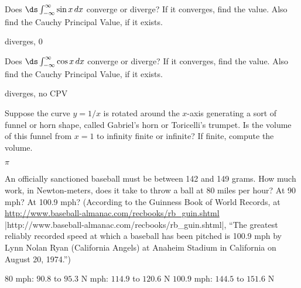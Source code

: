 \begin{exercises}
\exercise Does $\ds\int_{-\infty}^\infty \sin x\,dx$ 
converge or diverge? If
it converges, find the value. Also find the Cauchy Principal Value, if
it exists.
\begin{answer} diverges, $0$
\end{answer}

\exercise Does $\ds\int_{-\infty}^\infty \cos x\,dx$ 
converge or diverge? If
it converges, find the value. Also find the Cauchy Principal Value, if
it exists.
\begin{answer} diverges, no CPV
\end{answer}

\exercise \relax
\label{exer:gabriels horn}
Suppose the curve $y=1/x$ is rotated around the $x$-axis
generating a sort of funnel or horn shape, called {\dfont
  Gabriel's horn\/} or {\dfont Toricelli's
  trumpet}. Is the volume of this funnel
from $x=1$ to infinity finite or infinite? If finite, compute the
volume.  
\begin{answer} $\pi$ 
\end{answer}

\exercise An officially sanctioned baseball must be between 142 and
149 grams. How much work, in Newton-meters, does it take to throw a
ball at 80 miles per hour? At 90 mph? At 100.9 mph?  (According to the
Guinness Book of World Records, at
\url{http://www.baseball-almanac.com/recbooks/rb_guin.shtml}
{\vb|http://www.baseball-almanac.com/recbooks/rb_guin.shtml|}\endurl, ``The
greatest reliably recorded speed at which a baseball has been pitched
is 100.9 mph by Lynn Nolan Ryan (California Angels) at Anaheim Stadium
in California on August 20, 1974.'')
\begin{answer} 80 mph: $90.8$ to $95.3$ N\hfill{} mph: $114.9$ to $120.6$ N\hfill\break
$100.9$ mph: $144.5$ to $151.6$ N
\end{answer}

\end{exercises}
